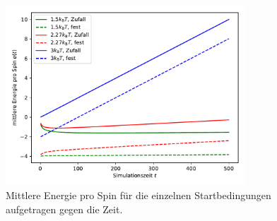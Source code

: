 \begin{figure}
  \centering
  \includegraphics[width = 0.8\textwidth ]{A2/build/plot_b.pdf}
  \caption{Mittlere Energie pro Spin für die einzelnen Startbedingungen aufgetragen gegen die Zeit.}
  \label{fig:b}
\end{figure}
